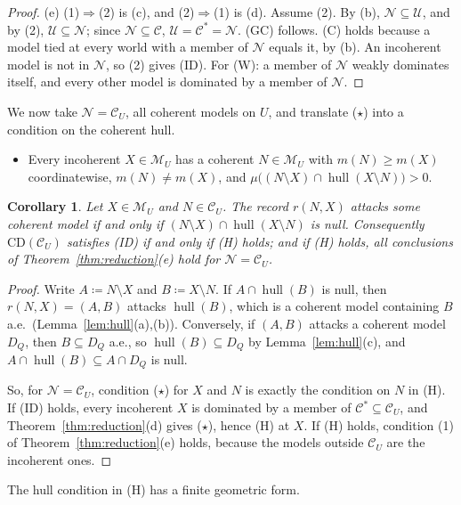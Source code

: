 \documentclass[11pt]{article}
\newcommand{\M}{\mathcal{M}}
\newcommand{\CC}{\mathcal{C}}
\newcommand{\UU}{\mathcal{U}}
\newcommand{\NN}{\mathcal{N}}
\newcommand{\CD}{\mathrm{CD}}
\newcommand{\hull}{\operatorname{hull}}
\theoremstyle{plain}
\newtheorem{corollary}[theorem]{Corollary}
\theoremstyle{definition}
\theoremstyle{remark}
\begin{document}
\begin{proof}
(e) (1)$\Rightarrow$(2) is (c), and (2)$\Rightarrow$(1) is (d). Assume (2). By (b),
$\NN\subseteq\UU$, and by (2), $\UU\subseteq\NN$; since $\NN\subseteq\CC$,
$\UU=\CC^\ast=\NN$. (GC) follows. (C) holds because a model tied at every world with a
member of $\NN$ equals it, by (b). An incoherent model is not in $\NN$, so (2) gives (ID).
For (W): a member of $\NN$ weakly dominates itself, and every other model is dominated by
a member of $\NN$.
\end{proof}

We now take $\NN=\CC_U$, all coherent models on $U$, and translate ($\star$) into a
condition on the coherent hull.

\begin{itemize}
  \item[(H)] Every incoherent $X\in\M_U$ has a coherent $N\in\M_U$ with $m(N)\ge m(X)$
  coordinatewise, $m(N)\ne m(X)$, and $\mu\bigl((N\setminus X)\cap\hull(X\setminus N)
  \bigr)>0$.
\end{itemize}

\begin{corollary}\label{cor:H}
Let $X\in\M_U$ and $N\in\CC_U$. The record $r(N,X)$ attacks some coherent model if and only
if $(N\setminus X)\cap\hull(X\setminus N)$ is null. Consequently $\CD(\CC_U)$ satisfies
(ID) if and only if (H) holds; and if (H) holds, all conclusions of
Theorem~\ref{thm:reduction}(e) hold for $\NN=\CC_U$.
\end{corollary}

\begin{proof}
Write $A\coloneqq N\setminus X$ and $B\coloneqq X\setminus N$. If $A\cap\hull(B)$ is
null, then $r(N,X)=(A,B)$ attacks $\hull(B)$, which is a coherent model containing $B$
a.e.\ (Lemma~\ref{lem:hull}(a),(b)). Conversely, if $(A,B)$ attacks a coherent model
$D_Q$, then $B\subseteq D_Q$ a.e., so $\hull(B)\subseteq D_Q$ by
Lemma~\ref{lem:hull}(c), and $A\cap\hull(B)\subseteq A\cap D_Q$ is null.

So, for $\NN=\CC_U$, condition ($\star$) for $X$ and $N$ is exactly the condition on $N$
in (H). If (ID) holds, every incoherent $X$ is dominated by a member of $\CC^\ast\subseteq
\CC_U$, and Theorem~\ref{thm:reduction}(d) gives ($\star$), hence (H) at $X$. If (H)
holds, condition (1) of Theorem~\ref{thm:reduction}(e) holds, because the models outside
$\CC_U$ are the incoherent ones.
\end{proof}

The hull condition in (H) has a finite geometric form.
\end{document}
